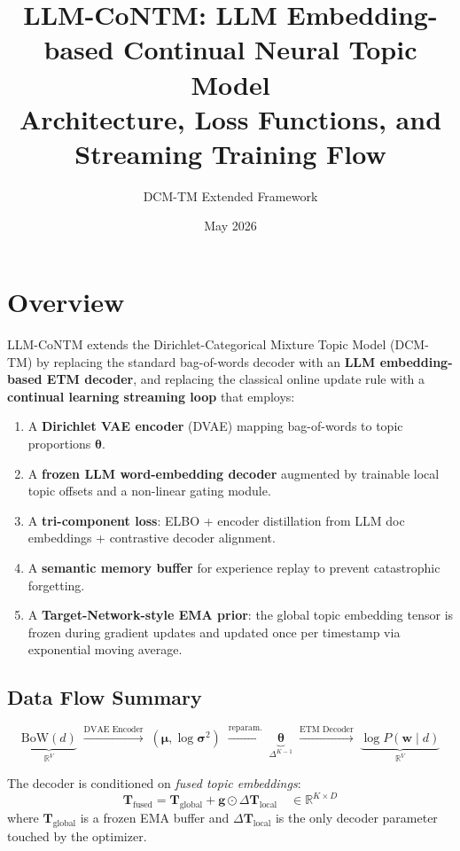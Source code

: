 \documentclass[11pt,a4paper]{article}
\title{\textbf{LLM-CoNTM: LLM Embedding-based Continual Neural Topic Model}\\
\large Architecture, Loss Functions, and Streaming Training Flow}
\author{DCM-TM Extended Framework}
\date{May 2026}
\begin{document}
\maketitle
\tableofcontents
\newpage

\section{Overview}

LLM-CoNTM extends the Dirichlet-Categorical Mixture Topic Model (DCM-TM) by replacing the
standard bag-of-words decoder with an \textbf{LLM embedding-based ETM decoder}, and replacing
the classical online update rule with a \textbf{continual learning streaming loop} that employs:

\begin{enumerate}
  \item A \textbf{Dirichlet VAE encoder} (DVAE) mapping bag-of-words to topic proportions $\boldsymbol{\theta}$.
  \item A \textbf{frozen LLM word-embedding decoder} augmented by trainable local topic offsets
        and a non-linear gating module.
  \item A \textbf{tri-component loss}: ELBO + encoder distillation from LLM doc embeddings +
        contrastive decoder alignment.
  \item A \textbf{semantic memory buffer} for experience replay to prevent catastrophic forgetting.
  \item A \textbf{Target-Network-style EMA prior}: the global topic embedding tensor is frozen
        during gradient updates and updated once per timestamp via exponential moving average.
\end{enumerate}

\subsection{Data Flow Summary}

\[
  \underbrace{\text{BoW}(d)}_{\mathbb{R}^V}
  \;\xrightarrow{\text{DVAE Encoder}}\;
  (\boldsymbol{\mu}, \log\boldsymbol{\sigma}^2)
  \;\xrightarrow{\text{reparam.}}\;
  \underbrace{\boldsymbol{\theta}}_{\Delta^{K-1}}
  \;\xrightarrow{\text{ETM Decoder}}\;
  \underbrace{\log P(\mathbf{w}\mid d)}_{\mathbb{R}^V}
\]

\medskip
\noindent The decoder is conditioned on \emph{fused topic embeddings}:
\[
  \mathbf{T}_{\text{fused}} = \mathbf{T}_{\text{global}} + \mathbf{g} \odot \Delta\mathbf{T}_{\text{local}}
  \quad \in \mathbb{R}^{K \times D}
\]
where $\mathbf{T}_{\text{global}}$ is a frozen EMA buffer and $\Delta\mathbf{T}_{\text{local}}$
is the only decoder parameter touched by the optimizer.
\end{document}

